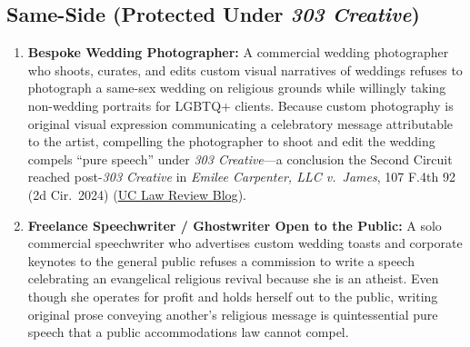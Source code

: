 \documentclass[12pt]{article}
\begin{document}
\subsection*{Same-Side (Protected Under \textit{303 Creative})}
\begin{enumerate}
  \item \textbf{Bespoke Wedding Photographer:} A commercial wedding photographer who shoots, curates, and edits custom visual narratives of weddings refuses to photograph a same-sex wedding on religious grounds while willingly taking non-wedding portraits for LGBTQ+ clients. Because custom photography is original visual expression communicating a celebratory message attributable to the artist, compelling the photographer to shoot and edit the wedding compels ``pure speech'' under \textit{303 Creative}---a conclusion the Second Circuit reached post-\textit{303 Creative} in \textit{Emilee Carpenter, LLC v.\ James}, 107 F.4th 92 (2d Cir.\ 2024) (\href{https://uclawreview.org/2026/10/16/when-does-free-expression-end-and-discrimination-begin-an-analysis-of-how-lower-courts-have-applied-the-303-creative-llc-v-elenis-decision/}{UC Law Review Blog}).
  \item \textbf{Freelance Speechwriter / Ghostwriter Open to the Public:} A solo commercial speechwriter who advertises custom wedding toasts and corporate keynotes to the general public refuses a commission to write a speech celebrating an evangelical religious revival because she is an atheist. Even though she operates for profit and holds herself out to the public, writing original prose conveying another's religious message is quintessential pure speech that a public accommodations law cannot compel.
\end{enumerate}
\end{document}
